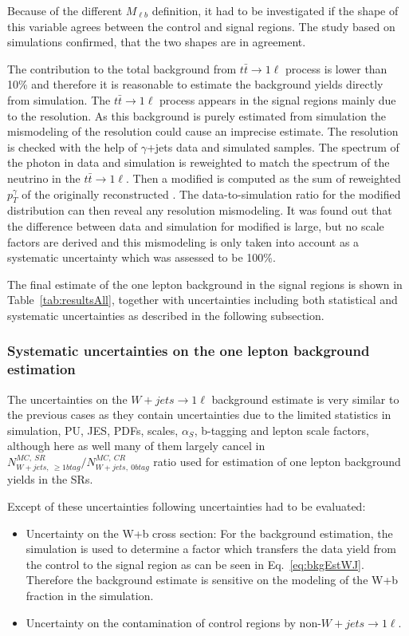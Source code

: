 Because of the different $M_{\ell b}$ definition, it had to be investigated if the shape of this variable agrees between the control and signal regions. The study based on simulations confirmed, that the two shapes are in agreement. 

The contribution to the total background from $t\bar{t} \to 1\ell$ process is lower than 10\% and therefore it is reasonable to estimate the background yields directly from simulation. The $t\bar{t} \to 1\ell$ process appears in the signal regions mainly due to the \MET resolution. As this background is purely estimated from simulation the mismodeling of the \MET resolution could cause an imprecise estimate. The \MET resolution is checked with the help of $\gamma$+jets data and simulated samples. The \pt spectrum of the photon in data and simulation is reweighted to match the \pt spectrum of the neutrino in the $t\bar{t} \to 1\ell$. Then a modified \MET is computed as the sum of reweighted $p_{T}^{\gamma}$ of the originally reconstructed \MET. The data-to-simulation ratio for the modified \MET distribution can then reveal any \MET resolution mismodeling. It was found out that the difference between data and simulation for modified \MET is large, but no scale factors are derived and this mismodeling is only taken into account as a systematic uncertainty which was assessed to be 100\%. %
 
The final estimate of the one lepton background in the signal regions is shown in Table~\ref{tab:resultsAll}, together with uncertainties including both statistical and systematic uncertainties as described in the following subsection.

\subsubsection{Systematic uncertainties on the one lepton background estimation}

The uncertainties on the $W+jets \to 1\ell$  background estimate is very similar to the previous cases as they contain uncertainties due to the limited statistics in simulation, PU, JES, PDFs, scales, $\alpha_{S}$, b-tagging and lepton scale factors, although here as well many of them largely cancel in $N^{MC,~SR}_{W+jets,~\geq 1btag}/ N^{MC,~CR}_{W+jets,~0btag}$ ratio used for estimation of one lepton background yields in the SRs.

Except of these uncertainties following uncertainties had to be evaluated:
\begin{itemize} 
\item Uncertainty on the W+b cross section: For the background estimation, the simulation is used to determine a factor which transfers the data yield from the control to the signal region as can be seen in Eq.~\ref{eq:bkgEstWJ}. Therefore the background estimate is sensitive on the modeling of the W+b fraction in the simulation.
\item Uncertainty on the contamination of control regions by non-$W+jets \to 1\ell$.
\end{itemize}

